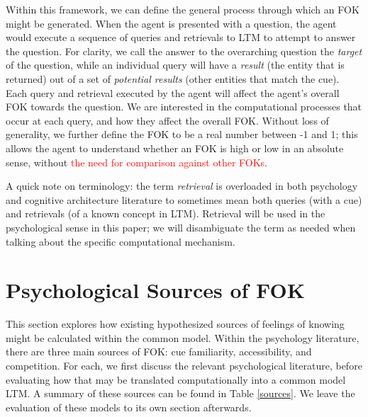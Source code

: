 \documentclass[10pt,letterpaper]{article}
\newcommand{\fixme}[2][]{#2}
\renewcommand{\fixme}[2][]{\textcolor{red}{#2}}
\begin{document}
Within this framework, we can define the general process through which an FOK might be generated.
When the agent is presented with a question, the agent would execute a sequence of queries and retrievals to LTM to attempt to answer the question.
For clarity, we call the answer to the overarching question the \emph{target} of the question, while an individual query will have a \emph{result} (the entity that is returned) out of a set of \emph{potential results} (other entities that match the cue).
Each query and retrieval executed by the agent will affect the agent's overall FOK towards the question.
We are interested in the computational processes that occur at each query, and how they affect the overall FOK.
Without loss of generality, we further define the FOK to be a real number between -1 and 1; this allows the agent to understand whether an FOK is high or low in an absolute sense, without \fixme[I'm not sure how that would work]{the need for comparison against other FOKs}.

A quick note on terminology: the term \emph{retrieval} is overloaded in both psychology and cognitive architecture literature to sometimes mean both queries (with a cue) and retrievals (of a known concept in LTM).
Retrieval will be used in the psychological sense in this paper; we will disambiguate the term as needed when talking about the specific computational mechanism.


\section{Psychological Sources of FOK}

This section explores how existing hypothesized sources of feelings of knowing might be calculated within the common model.
Within the psychology literature, there are three main sources of FOK: cue familiarity, accessibility, and competition.
For each, we first discuss the relevant psychological literature, before evaluating how that may be translated computationally into a common model LTM.
A summary of these sources can be found in Table \ref{sources}.
We leave the evaluation of these models to its own section afterwards.
\end{document}
